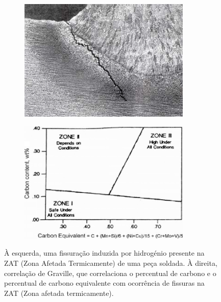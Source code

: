 \begin{figure}[htb]
    \centering
    \begin{subfigure}{.4\textwidth}
        \includegraphics[width = 0.9\textwidth]{Figures/Cap2/Cold_Cracking.png}
        \caption{}
        \label{fig:Fissuracao_1}
    \end{subfigure}%
    \begin{subfigure}{.4\textwidth}
        \centering
        \includegraphics[width = 0.9\textwidth]{Figures/Cap2/Graville_Diagram.png}
        \caption{}
        \label{fig:Graville}
    \end{subfigure}
    \caption[Fissuração induzida por hidrogénio e correlação de Graville]%
    {À esquerda, uma fissuração induzida por hidrogénio presente na ZAT (Zona Afetada Termicamente) de uma peça soldada. À direita, correlação de Graville, que correlaciona o percentual de carbono e o percentual de carbono equivalente com ocorrência de fissuras na ZAT (Zona afetada termicamente)\cite{Olson2007}. }
\end{figure}
